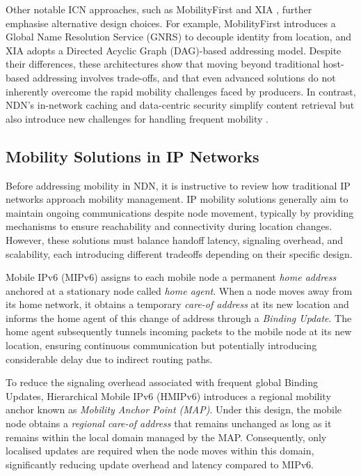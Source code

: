 Other notable ICN approaches, such as MobilityFirst \cite{Raychaudhuri-12} and XIA \cite{Naylor-14}, further emphasise alternative design choices. For example, MobilityFirst introduces a Global Name Resolution Service (GNRS) to decouple identity from location, and XIA adopts a Directed Acyclic Graph (DAG)-based addressing model. Despite their differences, these architectures show that moving beyond traditional host-based addressing involves trade-offs, and that even advanced solutions do not inherently overcome the rapid mobility challenges faced by producers. In contrast, NDN’s in-network caching and data-centric security simplify content retrieval but also introduce new challenges for handling frequent mobility \cite{Grassi-14,Jacobson-09}.

\subsection{Mobility Solutions in IP Networks}
Before addressing mobility in NDN, it is instructive to review how traditional IP networks approach mobility management. IP mobility solutions generally aim to maintain ongoing communications despite node movement, typically by providing mechanisms to ensure reachability and connectivity during location changes. However, these solutions must balance handoff latency, signaling overhead, and scalability, each introducing different tradeoffs depending on their specific design.

Mobile IPv6 (MIPv6) \cite{Johnson-04} assigns to each mobile node a permanent \emph{home address} anchored at a stationary node called \emph{home agent}. When a node moves away from its home network, it obtains a temporary \emph{care-of address} at its new location and informs the home agent of this change of address through a \emph{Binding Update}. The home agent subsequently tunnels incoming packets to the mobile node at its new location, ensuring continuous communication but potentially introducing considerable delay due to indirect routing paths.

To reduce the signaling overhead associated with frequent global Binding Updates, Hierarchical Mobile IPv6 (HMIPv6) \cite{Soliman-08} introduces a regional mobility anchor known as \emph{Mobility Anchor Point (MAP)}. Under this design, the mobile node obtains a \emph{regional care-of address} that remains unchanged as long as it remains within the local domain managed by the MAP. Consequently, only localised updates are required when the node moves within this domain, significantly reducing update overhead and latency compared to MIPv6.

